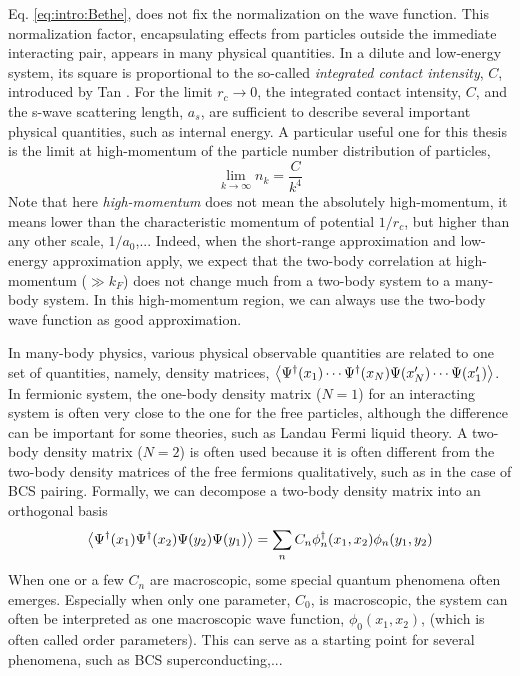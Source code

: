   Eq. \ref{eq:intro:Bethe}, does not fix the normalization on the wave function. This normalization factor, encapsulating effects from particles outside the immediate interacting pair, appears in many physical quantities.  In a dilute and low-energy system,  its square is proportional to the so-called \emph{integrated contact intensity}, $C$, introduced by Tan \cite{ Tan2008-1,Tan2008-2,CombescotTan}.  For the limit $r_c\to0$, the integrated contact intensity, $C$, and the s-wave scattering length, $a_s$, are sufficient to describe several important physical quantities, such as  internal energy.  A particular useful one for this thesis is the limit at high-momentum of the particle number distribution of particles, 
 \begin{equation}
 \lim_{k\to\infty}n_k=\frac{C}{k^4}
 \end{equation}
 Note that here \emph{high-momentum} does not mean the absolutely high-momentum, it means lower than the characteristic momentum of potential $1/r_c$, but higher than any other scale, $1/a_0$,...  
 Indeed, when the short-range approximation and low-energy approximation apply, we expect that the two-body correlation at  high-momentum ($\gg{k_{F}}$) does not change much from a two-body system to a many-body system.  In this high-momentum region, we can always use   the two-body wave function as good approximation. 
 
 In many-body physics, various physical observable quantities are related to one set of  quantities, namely, density matrices,  $\bigl<{\Psi^{\dagger}(x_{1})\cdots\Psi^{\dagger}(x_{N})\Psi(x'_{N})\cdots\Psi(x'_{1})}\bigr>$. In fermionic system,  the one-body density matrix ($N=1$) for an interacting system is often very close to the one for the free particles, although the difference can be important for some theories, such as Landau Fermi liquid theory.  A two-body density matrix ($N=2$) is often  used because it is often different from the two-body density matrices of the free fermions qualitatively, such as in the case of BCS pairing. Formally, we can decompose a two-body density matrix into an orthogonal basis
 \begin{equation}\label{eq:intro:2bodyDM}
 \bigl<{\Psi^{\dagger}(x_1)\Psi^{\dagger}(x_2)\Psi(y_2)\Psi(y_1)}\bigr>=\sum_nC_n\phi_n^{\dagger}(x_1,x_2)\phi_n(y_1,y_2)
 \end{equation}     
 When one or a few $C_n$ are macroscopic,  some special quantum phenomena often emerges.  Especially when only one parameter, $C_{0}$, is macroscopic, the system can often be interpreted as one macroscopic wave function, $\phi_{0}(x_{1},x_{2})$, (which is often called  order parameters).\cite{Leggett}  This can serve as a starting point for several phenomena, such as  BCS superconducting,...
 
